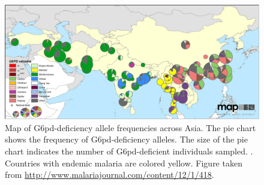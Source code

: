 \documentclass{article}
\begin{document}
\begin{figure}[ht]
\begin{center}
  \includegraphics[width=1.0\textwidth]{G6pd_Howes_et_al_1475-2875-12-418-4}   %
\caption{ 
Map of G6pd-deficiency allele frequencies across Asia. The pie chart shows
  the frequency of G6pd-deficiency alleles. The size of the pie chart
  indicates the number of G6pd-deficient individuals sampled.
. Countries with
  endemic malaria are colored yellow. Figure taken from
  \citet{Howes-g6pd-variants} \url{http://www.malariajournal.com/content/12/1/418}.
}
\end{center}
\end{figure}






\end{document}
